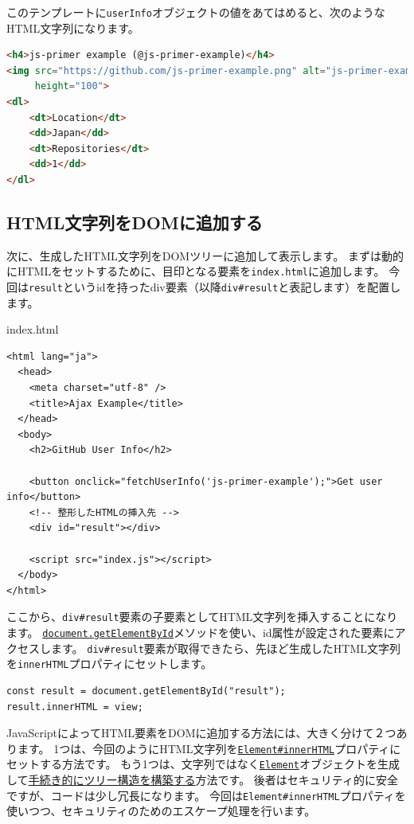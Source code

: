 このテンプレートに\texttt{userInfo}オブジェクトの値をあてはめると、次のようなHTML文字列になります。

\begin{lstlisting}[language=HTML]
<h4>js-primer example (@js-primer-example)</h4>
<img src="https://github.com/js-primer-example.png" alt="js-primer-example" 
     height="100">
<dl>
    <dt>Location</dt>
    <dd>Japan</dd>
    <dt>Repositories</dt>
    <dd>1</dd>
</dl>
\end{lstlisting}

\hypertarget{html-to-dom}{%
\subsection{HTML文字列をDOMに追加する}\label{html-to-dom}}

次に、生成したHTML文字列をDOMツリーに追加して表示します。
まずは動的にHTMLをセットするために、目印となる要素を\texttt{index.html}に追加します。
今回は\texttt{result}というidを持ったdiv要素（以降\texttt{div\#result}と表記します）を配置します。

\begin{listtitle}
index.html
\end{listtitle}
\begin{lstlisting}
<html lang="ja">
  <head>
    <meta charset="utf-8" />
    <title>Ajax Example</title>
  </head>
  <body>
    <h2>GitHub User Info</h2>

    <button onclick="fetchUserInfo('js-primer-example');">Get user info</button>
    <!-- 整形したHTMLの挿入先 -->
    <div id="result"></div>

    <script src="index.js"></script>
  </body>
</html>
\end{lstlisting}
\listend

ここから、\texttt{div\#result}要素の子要素としてHTML文字列を挿入することになります。
\href{https://developer.mozilla.org/ja/docs/Web/API/Document/getElementById}\texttt{document.getElementById}メソッドを使い、id属性が設定された要素にアクセスします。
\texttt{div\#result}要素が取得できたら、先ほど生成したHTML文字列を\texttt{innerHTML}プロパティにセットします。

\begin{lstlisting}
const result = document.getElementById("result");
result.innerHTML = view;
\end{lstlisting}

JavaScriptによってHTML要素をDOMに追加する方法には、大きく分けて２つあります。
1つは、今回のようにHTML文字列を\href{https://developer.mozilla.org/ja/docs/Web/API/Element/innerHTML}\texttt{Element\#innerHTML}プロパティにセットする方法です。
もう1つは、文字列ではなく\href{https://developer.mozilla.org/ja/docs/Web/API/Element}\texttt{Element}オブジェクトを生成して\href{https://developer.mozilla.org/ja/docs/Web/API/Node/appendChild}{手続き的にツリー構造を構築する}方法です。
後者はセキュリティ的に安全ですが、コードは少し冗長になります。
今回は\texttt{Element\#innerHTML}プロパティを使いつつ、セキュリティのためのエスケープ処理を行います。

